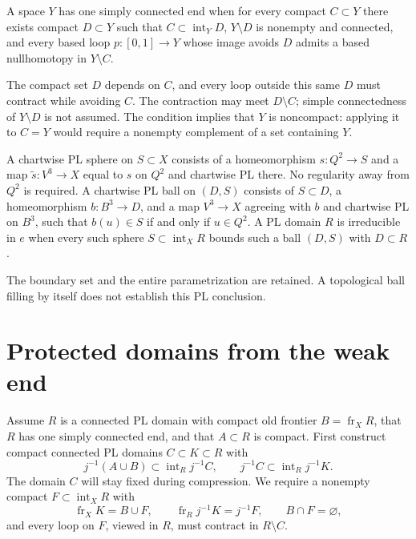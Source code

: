 \begin{definition}
\label{def:one-simply-connected-end}
A space $Y$ has one simply connected end when for every compact
$C\subset Y$ there exists compact $D\subset Y$ such that
$C\subset\operatorname{int}_Y D$, $Y\setminus D$ is nonempty and connected,
and every based loop $p:[0,1]\to Y$ whose image avoids $D$ admits a
based nullhomotopy in $Y\setminus C$.
\end{definition}

The compact set $D$ depends on $C$, and every loop outside this same $D$
must contract while avoiding $C$. The contraction may meet $D\setminus C$;
simple connectedness of $Y\setminus D$ is not assumed. The condition
implies that $Y$ is noncompact: applying it to $C=Y$ would require a
nonempty complement of a set containing $Y$.

\begin{definition}
\label{def:chartwise-sphere-ball}
A chartwise PL sphere on $S\subset X$ consists of a homeomorphism
$s:Q^2\to S$ and a map $\widetilde s:V^3\to X$ equal to $s$ on $Q^2$
and chartwise PL there. No regularity away from $Q^2$ is required.
A chartwise PL ball on $(D,S)$ consists of $S\subset D$, a homeomorphism
$b:B^3\to D$, and a map $V^3\to X$ agreeing with $b$ and chartwise PL
on $B^3$, such that $b(u)\in S$ if and only if $u\in Q^2$.
A PL domain $R$ is irreducible in $e$ when every such sphere
$S\subset\operatorname{int}_X R$ bounds such a ball $(D,S)$ with $D\subset R$.
\end{definition}

The boundary set and the entire parametrization are retained. A topological
ball filling by itself does not establish this PL conclusion.

\section{Protected domains from the weak end}
\label{sec:weak-end-core}

Assume $R$ is a connected PL domain with compact old frontier
$B=\operatorname{fr}_X R$, that $R$ has one simply connected end, and that
$A\subset R$ is compact. First construct compact connected PL domains
$C\subset K\subset R$ with
\[
 j^{-1}(A\cup B)\subset\operatorname{int}_R j^{-1}C,
 \qquad j^{-1}C\subset\operatorname{int}_R j^{-1}K.
\]
The domain $C$ will stay fixed during compression. We require a nonempty
compact $F\subset\operatorname{int}_X R$ with
\begin{equation}
 \operatorname{fr}_X K=B\cup F,\qquad
 \operatorname{fr}_R j^{-1}K=j^{-1}F,\qquad B\cap F=\varnothing,
 \label{eq:protected-frontiers}
\end{equation}
and every loop on $F$, viewed in $R$, must contract in $R\setminus C$.

